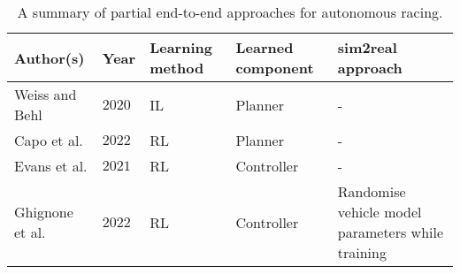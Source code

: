 
\begin{table}[htb!]
\centering
\small
\renewcommand{\arraystretch}{1.1}
\begin{tabularx}{\textwidth}{RYMNL}
    \hline
    \small \textbf{Author(s)} &  \small \textbf{Year} & \small \textbf{Learning method} & \small \textbf{Learned component} & \small \textbf{sim2real approach} \\
    \hline
    \small Weiss and Behl \cite{Weiss2020, Weiss2020a, Weiss2022} & \small $2020$ & \small IL & \small Planner  & - \\
    \small Capo et al. \cite{Capo2020} & \small $2022$ & \small RL &  \small Planner & - \\
    \small Evans et al. \cite{Evans2021b} & \small $2021$ & \small RL &  \small Controller & - \\
    \small Ghignone et al. \cite{Ghignone2022} & \small $2022$ & \small RL &  \small Controller  & \small Randomise vehicle model parameters while training \\
    \hline
\end{tabularx}
\caption[A summary of partial end-to-end approaches for autonomous racing]{A summary of partial end-to-end approaches for autonomous racing.}
\label{table:autonomous_racing_partial_end_to_end_summary}
\end{table} 
